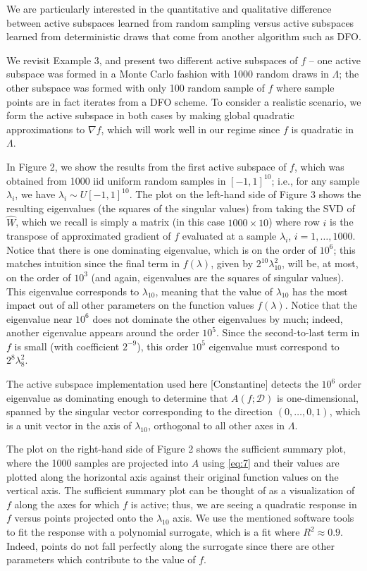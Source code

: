 \documentclass{amsart}
\begin{document}
We are particularly interested in the quantitative and qualitative difference between active subspaces learned from random sampling versus active subspaces learned from deterministic draws that come from another algorithm such as DFO.


We revisit Example 3, and present two different active subspaces of $f$ -- one active subspace was formed in a Monte Carlo fashion with 1000 random draws in $\Lambda$; the other subspace was formed with only 100 random sample of $f$ where sample points are in fact iterates from a DFO scheme. To consider a realistic scenario, we form the active subspace in both cases by making global quadratic approximations to $\nabla f$, which will work well in our regime since $f$ is quadratic in $\Lambda$.

In Figure 2, we show the results from the first active subspace of $f$, which was obtained from 1000 iid uniform random samples in $[-1,1]^{10}$; i.e., for any sample $\lambda_i$, we have $\lambda_i \sim U[-1,1]^{10}$. The plot on the left-hand side of Figure 3 shows the resulting eigenvalues (the squares of the singular values) from taking the SVD of $\hat{W}$, which we recall is simply a matrix (in this case $1000 \times 10$) where row $i$ is the transpose of approximated gradient of $f$ evaluated at a sample $\lambda_i$, $i=1,\ldots,1000$. Notice that there is one dominating eigenvalue, which is on the order of $10^6$; this matches intuition since the final term in $f(\lambda)$, given by $2^{10}\lambda_{10}^2$, will be, at most, on the order of $10^3$ (and again, eigenvalues are the squares of singular values). This eigenvalue corresponds to $\lambda_{10}$, meaning that the value of $\lambda_{10}$ has the most impact out of all other parameters on the function values $f(\lambda)$. Notice that the eigenvalue near $10^6$ does not dominate the other eigenvalues by much; indeed, another eigenvalue appears around the order $10^5$. Since the second-to-last term in $f$ is small (with coefficient $2^{-9}$), this order $10^5$ eigenvalue must correspond to $2^8\lambda_8^2$.

The active subspace implementation used here [Constantine] detects the $10^6$ order eigenvalue as dominating enough to determine that $A(f;\mathcal{D})$ is one-dimensional, spanned by the singular vector corresponding to the direction $(0,\ldots,0,1)$, which is a unit vector in the axis of $\lambda_{10}$, orthogonal to all other axes in $\Lambda$.

The plot on the right-hand side of Figure 2 shows the sufficient summary plot, where the 1000 samples are projected into $A$ using \eqref{eq:7} and their values are plotted along the horizontal axis against their original function values on the vertical axis. The sufficient summary plot can be thought of as a visualization of $f$ along the axes for which $f$ is active; thus, we are seeing a quadratic response in $f$ versus points projected onto the $\lambda_{10}$ axis. We use the mentioned software tools to fit the response with a polynomial surrogate, which is a fit where $R^2\approx 0.9$. Indeed, points do not fall perfectly along the surrogate since there are other parameters which contribute to the value of $f$.
\end{document}
